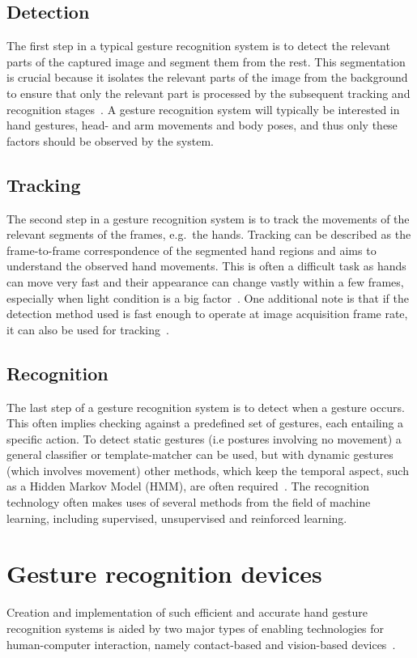 \documentclass[UKenglish]{ifimaster}
\begin{document}
\section{Detection}
The first step in a typical gesture recognition system is to detect the relevant parts of the captured image and segment them from the rest. This segmentation is crucial because it isolates the relevant parts of the image from the background to ensure that only the relevant part is processed by the subsequent tracking and recognition stages~\citep{Cote2006}. A gesture recognition system will typically be interested in hand gestures, head- and arm movements and body poses, and thus only these factors should be observed by the system.

\section{Tracking}
The second step in a gesture recognition system is to track the movements of the relevant segments of the frames, e.g.~the hands. Tracking can be described as the frame-to-frame correspondence of the segmented hand regions and aims to understand the observed hand movements. This
is often a difficult task as hands can move very fast and their appearance can change vastly within a few frames, especially when light condition is a big factor~\citep{Wang2010}. One additional note is that if the detection method used is fast enough to operate at image acquisition frame rate, it can also be used for tracking~\citep{Rautaray2015}.   

\section{Recognition}
The last step of a gesture recognition system is to detect when a gesture occurs. This often implies checking against a predefined set of gestures, each entailing a specific action. To detect static gestures (i.e postures involving no movement) a general classifier or template-matcher can be used, but with dynamic gestures (which involves movement) other methods, which keep the temporal aspect, such as a Hidden Markov Model (HMM), are often required~\citep{Benton1995}. The recognition technology often makes uses of several methods from the field of machine learning, including supervised, unsupervised and reinforced learning.

\chapter{Gesture recognition devices}
Creation and implementation of such efficient and
accurate hand gesture recognition systems is aided by two major types of enabling
technologies for human-computer interaction, namely contact-based and vision-based devices~\citep{Rautaray2015}. 
\end{document}
